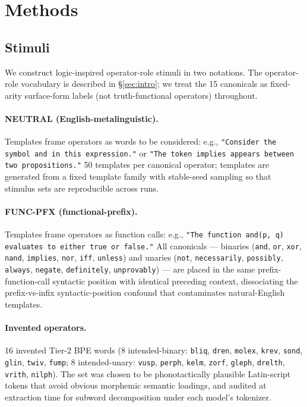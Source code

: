 \documentclass[11pt,letterpaper]{article}
\begin{document}
\section{Methods}
\label{sec:methods}

\subsection{Stimuli}
\label{sec:stimuli}

We construct logic-inspired operator-role stimuli in two notations.
The operator-role vocabulary is described in \S\ref{sec:intro}; we
treat the 15 canonicals as fixed-arity surface-form labels (not
truth-functional operators) throughout.

\paragraph{NEUTRAL (English-metalinguistic).} Templates frame operators
as words to be considered: e.g., \texttt{"Consider the symbol and in
this expression."} or \texttt{"The token implies appears between two
propositions."} 50 templates per canonical operator; templates are
generated from a fixed template family with stable-seed sampling so
that stimulus sets are reproducible across runs.

\paragraph{FUNC-PFX (functional-prefix).} Templates frame operators as
function calls: e.g., \texttt{"The function and(p, q) evaluates to
either true or false."} All canonicals --- binaries (\texttt{and},
\texttt{or}, \texttt{xor}, \texttt{nand}, \texttt{implies},
\texttt{nor}, \texttt{iff}, \texttt{unless}) and unaries
(\texttt{not}, \texttt{necessarily}, \texttt{possibly},
\texttt{always}, \texttt{negate}, \texttt{definitely},
\texttt{unprovably}) --- are placed in the same prefix-function-call
syntactic position with identical preceding context, dissociating the
prefix-vs-infix syntactic-position confound that contaminates
natural-English templates.

\paragraph{Invented operators.} 16 invented Tier-2 BPE words
(8 intended-binary: \texttt{bliq}, \texttt{dren}, \texttt{molex},
\texttt{krev}, \texttt{sond}, \texttt{glin}, \texttt{twiv},
\texttt{fump}; 8 intended-unary: \texttt{vusp}, \texttt{perph},
\texttt{kelm}, \texttt{zorf}, \texttt{gleph}, \texttt{drelth},
\texttt{vrith}, \texttt{nilph}). The set was chosen to be
phonotactically plausible Latin-script tokens that avoid obvious
morphemic semantic loadings, and audited at extraction time for
subword decomposition under each model's tokenizer.
\end{document}
